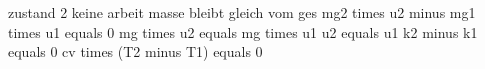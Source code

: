 zustand 2 keine arbeit  
masse bleibt gleich vom ges  
mg2 times u2 minus mg1 times u1 equals 0  
mg times u2 equals mg times u1  
u2 equals u1  
k2 minus k1 equals 0  
cv times (T2 minus T1) equals 0